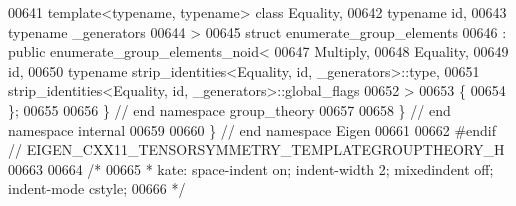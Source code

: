 \begin{DoxyCode}
00641   \textcolor{keyword}{template}<\textcolor{keyword}{typename}, \textcolor{keyword}{typename}> \textcolor{keyword}{class }Equality,
00642   \textcolor{keyword}{typename} id,
00643   \textcolor{keyword}{typename} \_generators
00644 >
00645 \textcolor{keyword}{struct }enumerate\_group\_elements
00646   : \textcolor{keyword}{public} enumerate\_group\_elements\_noid<
00647       Multiply,
00648       Equality,
00649       id,
00650       typename strip\_identities<Equality, id, \_generators>::type,
00651       strip\_identities<Equality, id, \_generators>::global\_flags
00652     >
00653 \{
00654 \};
00655 
00656 \} \textcolor{comment}{// end namespace group\_theory}
00657 
00658 \} \textcolor{comment}{// end namespace internal}
00659 
00660 \} \textcolor{comment}{// end namespace Eigen}
00661 
00662 \textcolor{preprocessor}{#endif // EIGEN\_CXX11\_TENSORSYMMETRY\_TEMPLATEGROUPTHEORY\_H}
00663 
00664 \textcolor{comment}{/*}
00665 \textcolor{comment}{ * kate: space-indent on; indent-width 2; mixedindent off; indent-mode cstyle;}
00666 \textcolor{comment}{ */}
\end{DoxyCode}
